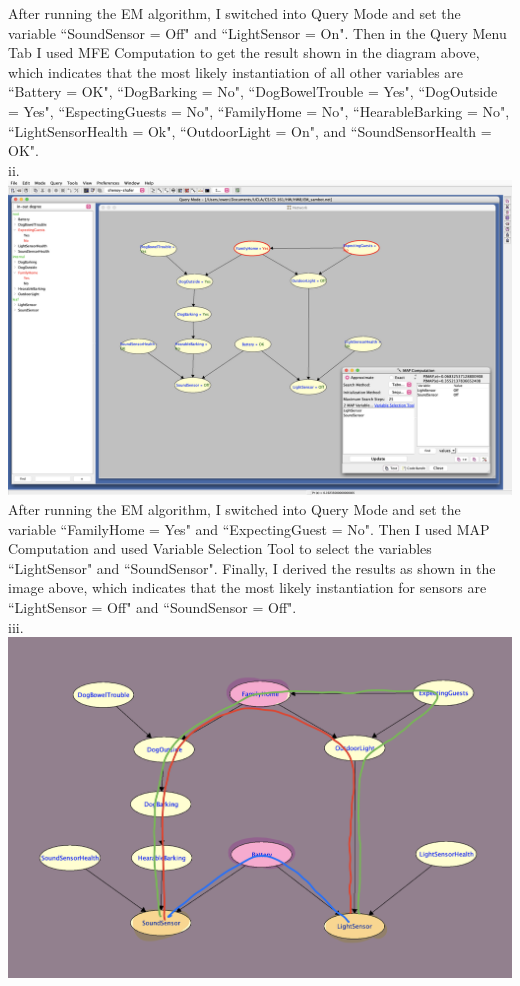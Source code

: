 \documentclass[11pt, oneside]{article}   	%
\begin{document}
\noindent After running the EM algorithm, I switched into Query Mode and set the variable ``SoundSensor = Off" and ``LightSensor = On". Then in the Query Menu Tab I used MFE Computation to get the result shown in the diagram above, which indicates that the most likely instantiation of all other variables are ``Battery = OK", ``DogBarking = No", ``DogBowelTrouble = Yes", ``DogOutside = Yes", ``EspectingGuests = No", ``FamilyHome = No", ``HearableBarking = No", ``LightSensorHealth = Ok", ``OutdoorLight = On", and ``SoundSensorHealth = OK".\\

\pagebreak 
\noindent{}ii. \\

\noindent{}\includegraphics[scale=0.25]{Q2cii}\\

\noindent After running the EM algorithm, I switched into Query Mode and set the variable ``FamilyHome = Yes" and ``ExpectingGuest = No". Then I used MAP Computation and used Variable Selection Tool to select the variables ``LightSensor" and ``SoundSensor". Finally, I derived the results as shown in the image above, which indicates that the most likely instantiation for sensors are ``LightSensor = Off" and ``SoundSensor = Off".\\

\pagebreak 
\noindent{}iii. \\

\includegraphics[scale=0.5]{Q2ciii}\\
\end{document}
